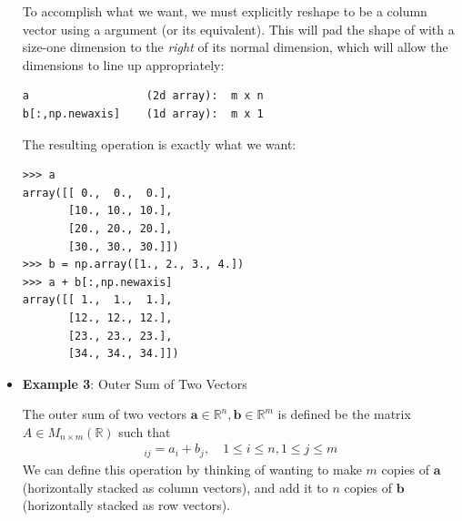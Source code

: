 \begin{itemize}
To accomplish what we want, we must explicitly reshape  to be a column vector using a  argument (or its equivalent). 
This will pad the shape of  with a size-one dimension to the \emph{right} of its normal dimension, which will allow the dimensions to line up appropriately:
\begin{lstlisting}
a	               (2d array):  m x n 
b[:,np.newaxis]	   (1d array):  m x 1
\end{lstlisting}

The resulting operation is exactly what we want:

\begin{lstlisting}
>>> a
array([[ 0.,  0.,  0.],
       [10., 10., 10.],
       [20., 20., 20.],
       [30., 30., 30.]])
>>> b = np.array([1., 2., 3., 4.])
>>> a + b[:,np.newaxis]
array([[ 1.,  1.,  1.],
       [12., 12., 12.],
       [23., 23., 23.],
       [34., 34., 34.]])
\end{lstlisting}



\item  \textbf{Example 3}: Outer Sum of Two Vectors 

The outer sum of two vectors $\mathbf{a} \in \mathbb{R}^n, \mathbf{b} \in \mathbb{R}^m$ is defined be the matrix $A \in M_{n \times m}(\mathbb{R})$ such that 
\begin{align*}
	[A]_{ij} = a_i + b_j, \quad 1 \leq i \leq n, 1 \leq j \leq m
\end{align*} 
We can define this operation by thinking of wanting to make $m$ copies of $\mathbf{a}$ (horizontally stacked as column vectors), and add it to $n$ copies of $\mathbf{b}$ (horizontally stacked as row vectors).


\end{itemize}
